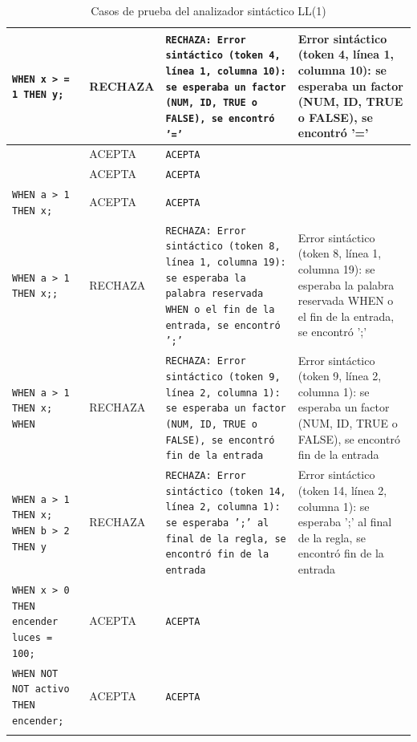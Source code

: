 \begin{longtable}{|p{6cm}|p{2cm}|p{5cm}|p{6cm}|}
\hline
\texttt{WHEN x > = 1 THEN y;} & RECHAZA & \texttt{RECHAZA: Error sintáctico (token 4, línea 1, columna 10): se esperaba un factor (NUM, ID, TRUE o FALSE), se encontró '='} & Error sintáctico (token 4, línea 1, columna 10): se esperaba un factor (NUM, ID, TRUE o FALSE), se encontró '=' \\
\hline
\texttt{} & ACEPTA & \texttt{ACEPTA} &  \\
\hline
\texttt{} & ACEPTA & \texttt{ACEPTA} &  \\
\hline
\texttt{WHEN a > 1 THEN x;} & ACEPTA & \texttt{ACEPTA} &  \\
\hline
\texttt{WHEN a > 1 THEN x;;} & RECHAZA & \texttt{RECHAZA: Error sintáctico (token 8, línea 1, columna 19): se esperaba la palabra reservada WHEN o el fin de la entrada, se encontró ';'} & Error sintáctico (token 8, línea 1, columna 19): se esperaba la palabra reservada WHEN o el fin de la entrada, se encontró ';' \\
\hline
\texttt{WHEN a > 1 THEN x; WHEN} & RECHAZA & \texttt{RECHAZA: Error sintáctico (token 9, línea 2, columna 1): se esperaba un factor (NUM, ID, TRUE o FALSE), se encontró fin de la entrada} & Error sintáctico (token 9, línea 2, columna 1): se esperaba un factor (NUM, ID, TRUE o FALSE), se encontró fin de la entrada \\
\hline
\texttt{WHEN a > 1 THEN x; WHEN b > 2 THEN y} & RECHAZA & \texttt{RECHAZA: Error sintáctico (token 14, línea 2, columna 1): se esperaba ';' al final de la regla, se encontró fin de la entrada} & Error sintáctico (token 14, línea 2, columna 1): se esperaba ';' al final de la regla, se encontró fin de la entrada \\
\hline
\texttt{WHEN x > 0 THEN encender luces = 100;} & ACEPTA & \texttt{ACEPTA} &  \\
\hline
\texttt{WHEN NOT NOT activo THEN encender;} & ACEPTA & \texttt{ACEPTA} &  \\
\hline
\caption{Casos de prueba del analizador sintáctico LL(1)}
\label{tab:casos}
\end{longtable}
